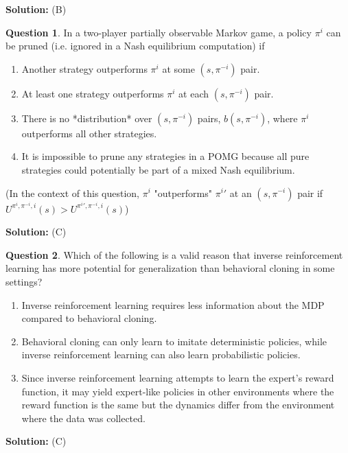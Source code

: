 \documentclass{article}
\theoremstyle{definition}
\newtheorem{question}{Question}
\begin{document}
\noindent\textbf{Solution:}
(B)

\begin{question}
In a two-player partially observable Markov game, a policy $\pi^i$ can be pruned (i.e. ignored in a Nash equilibrium computation) if

\begin{enumerate}[label=(\Alph*)]
    \item Another strategy outperforms $\pi^i$ at some $(s, \pi^{-i})$ pair.
    \item At least one strategy outperforms $\pi^i$ at each $(s, \pi^{-i})$ pair.
    \item There is no *distribution* over $(s, \pi^{-i})$ pairs, $b(s, \pi^{-i})$, where $\pi^i$ outperforms all other strategies.
    \item It is impossible to prune any strategies in a POMG because all pure strategies could potentially be part of a mixed Nash equilibrium.
\end{enumerate}

(In the context of this question, $\pi^i$ "outperforms" ${\pi^i}'$ at an $(s, \pi^{-i})$ pair if $U^{\pi^i,\pi^{-i},i}(s) > U^{{\pi^i}',\pi^{-i},i}(s)$)
\end{question}

\noindent\textbf{Solution:}
(C)

\begin{question}
Which of the following is a valid reason that inverse reinforcement learning has more potential for generalization than behavioral cloning in some settings?

\begin{enumerate}[label=(\Alph*)]
\item Inverse reinforcement learning requires less information about the MDP compared to behavioral cloning.
\item Behavioral cloning can only learn to imitate deterministic policies, while inverse reinforcement learning can also learn probabilistic policies.
\item Since inverse reinforcement learning attempts to learn the expert's reward function, it may yield expert-like policies in other environments where the reward function is the same but the dynamics differ from the environment where the data was collected.
\end{enumerate}
\end{question}

\noindent\textbf{Solution:} (C)
\end{document}
